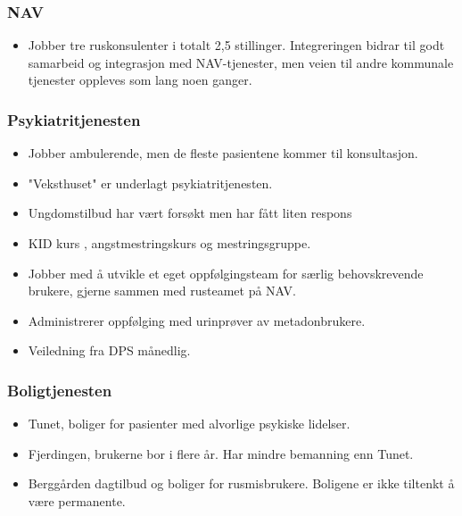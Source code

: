 \documentclass[11pt]{report} %
\begin{document}
                    \subsubsection{NAV}\label{sec:org_nek_nav}
                      \begin{itemize}
                        \item Jobber tre ruskonsulenter i totalt 2,5 stillinger. Integreringen bidrar til godt samarbeid og integrasjon med NAV-tjenester, men veien til andre kommunale tjenester oppleves som lang noen ganger. 
                      \end{itemize}
                    \subsubsection{Psykiatritjenesten}\label{sec:org_nek_psyk}  
                      \begin{itemize} 
                        \item Jobber ambulerende, men de fleste pasientene kommer til konsultasjon. 
                        \item "Veksthuset" er underlagt psykiatritjenesten.
                        \item Ungdomstilbud har vært forsøkt men har fått liten respons
                        \item KID kurs , angstmestringskurs og mestringsgruppe.
                        \item Jobber med å utvikle et eget oppfølgingsteam for særlig behovskrevende brukere, gjerne sammen med rusteamet på NAV. 
                        \item Administrerer oppfølging med urinprøver av metadonbrukere. 
                        \item Veiledning fra DPS månedlig.
                      \end{itemize}
                  \subsubsection{Boligtjenesten}\label{sec:org_nek_psyk}  
                      \begin{itemize} 
                        \item Tunet, boliger for pasienter med alvorlige psykiske lidelser.
                        \item Fjerdingen, brukerne bor i flere år. Har mindre bemanning enn Tunet.
                        \item Berggården dagtilbud og boliger for rusmisbrukere. Boligene er ikke tiltenkt å være permanente.
                      \end{itemize}
                      
\end{document}

